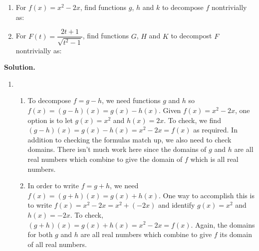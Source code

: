 \begin{ex} \label{funcarithdecompex}  

\begin{enumerate}

\item  For  $f(x) = x^2 - 2x$, find functions $g$, $h$ and $k$ to decompose $f$ nontrivially as:


\item  For $F(t) = \dfrac{2t+1}{\sqrt{t^2-1}}$, find functions $G$, $H$ and $K$ to decompost $F$ nontrivially as:


\end{enumerate}

{\bf Solution.}

\begin{enumerate}

\item 

\begin{enumerate}

\item To decompose $f = g-h$, we need functions $g$ and $h$ so $f(x) = (g-h)(x) = g(x) - h(x)$.  Given $f(x) = x^2 - 2x$,  one option is to let $g(x) = x^2$ and $h(x) = 2x$.  To check, we find $(g-h)(x) = g(x) - h(x) = x^2-2x = f(x)$ as required.  In addition to checking the formulas match up, we also need to check domains.  There isn't much work here since the domains of $g$ and $h$ are all real numbers which combine to give the domain of $f$ which is all real numbers.

\item  In order to write $f = g+h$, we need $f(x) = (g+h)(x) = g(x) + h(x)$.  One way to accomplish this is to write $f(x) = x^2 - 2x = x^2+(-2x)$ and identify $g(x) = x^2$ and $h(x)  = -2x$.  To check, $(g+h)(x) = g(x) + h(x) = x^2 - 2x = f(x)$.  Again, the domains for both $g$ and $h$ are all real numbers which combine to give $f$ its domain of all real numbers.


\end{enumerate}
\end{enumerate}
\end{ex}
